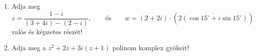 \documentclass[11pt]{scrartcl}
\begin{document}
\begin{enumerate}
	\item Adja meg
	      \[
		      z = \frac{1 - i}{(3 + 4i) - (2 - i)}, \qquad \text{és} \qquad
		      w = (2 + 2i) \cdot \left(\overline{2(\cos 15^\circ + i \sin 15^\circ)}\right)
	      \]
	      valós és képzetes részét!

	\item Adja meg a $z^2 + 2z + 3i(z + 1)$ polinom komplex gyökeit!
\end{enumerate}
\end{document}
